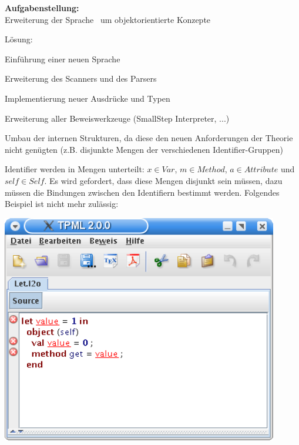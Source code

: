 {
  \textbf{Aufgabenstellung:}\\[2mm]
  Erweiterung der Sprache \LTWO\ um objektorientierte Konzepte

  {
    \begin{itemgroup}{Lösung:}
      \item Einführung einer neuen Sprache \LTWOO
      \item Erweiterung des Scanners und des Parsers
      \item Implementierung neuer Ausdrücke und Typen
      \item Erweiterung aller Beweiswerkzeuge (SmallStep Interpreter, ...)
      \item Umbau der internen Strukturen, da diese den neuen Anforderungen der
            Theorie nicht genügten (z.B. disjunkte Mengen der verschiedenen Identifier-Gruppen)
    \end{itemgroup}
  }
}

{
  Identifier werden in Mengen unterteilt: $x \in Var$, $m \in Method$, $a \in Attribute$ 
  und $self \in Self$. Es wird gefordert, dass diese Mengen disjunkt sein müssen,
  dazu müssen die Bindungen zwischen den Identifiern bestimmt werden. Folgendes
  Beispiel ist nicht mehr zulässig:

  \begin{center}
    \includegraphics[height=10cm]{images/object_disjunction.png}
  \end{center}
}

